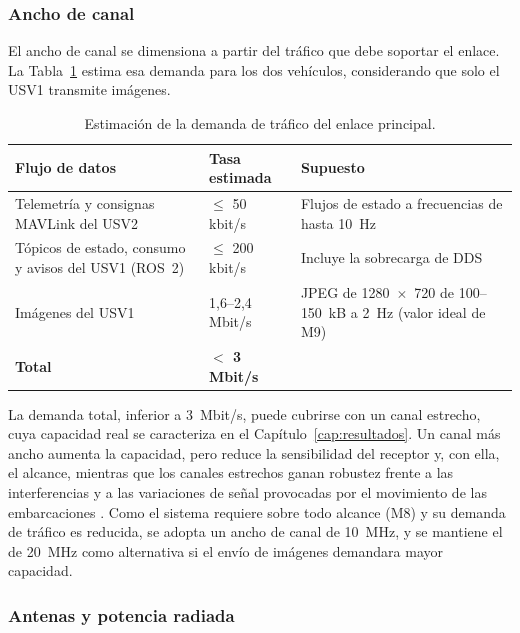\subsubsection{Ancho de canal}
 
El ancho de canal se dimensiona a partir del tráfico que debe soportar el enlace. La Tabla~\ref{tab:demanda_trafico} 
estima esa demanda para los dos vehículos, considerando que solo el USV1 transmite imágenes.
 
\begin{table}[!htb]
\centering
\caption{Estimación de la demanda de tráfico del enlace principal.}
\label{tab:demanda_trafico}
\small
\begin{tabular}{|p{5.2cm}|p{3.8cm}|p{4.8cm}|}
\hline
\textbf{Flujo de datos} & \textbf{Tasa estimada} & \textbf{Supuesto} \\ \hline
Telemetría y consignas MAVLink del USV2 & $\leq$ 50 kbit/s & Flujos de estado a frecuencias de hasta 10~Hz \\ \hline
Tópicos de estado, consumo y avisos del USV1 (ROS~2) & $\leq$ 200 kbit/s & Incluye la sobrecarga de DDS \\ \hline
Imágenes del USV1 & 1,6--2,4 Mbit/s & JPEG de 1280~$\times$~720 de 100--150~kB a 2~Hz (valor ideal de M9) \\ \hline
\textbf{Total} & \textbf{$<$ 3 Mbit/s} & \\ \hline
\end{tabular}
\end{table}
 
La demanda total, inferior a 3~Mbit/s, puede cubrirse con un canal estrecho, cuya capacidad real se caracteriza 
en el Capítulo~\ref{cap:resultados}. Un canal más ancho aumenta la capacidad, pero reduce la sensibilidad del 
receptor y, con ella, el alcance, mientras que los canales estrechos ganan robustez frente a las 
interferencias y a las variaciones de señal provocadas por el movimiento de las embarcaciones \cite{Cite25}. 
Como el sistema requiere sobre todo alcance (M8) y su demanda de tráfico es reducida, se adopta un ancho de 
canal de 10~MHz, y se mantiene el de 20~MHz como alternativa si el envío de imágenes demandara mayor capacidad.
 
\subsubsection{Antenas y potencia radiada}
 
